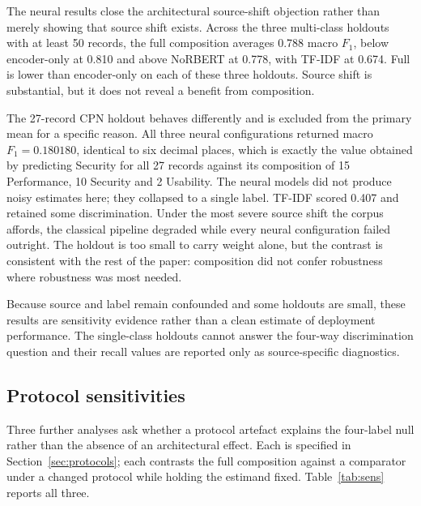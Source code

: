 \documentclass[11pt,a4paper]{article}
\begin{document}
The neural results close the architectural source-shift objection rather than merely showing that source
shift exists. Across the three multi-class holdouts with at least 50 records, the full composition
averages 0.788 macro $F_1$, below encoder-only at 0.810 and above NoRBERT at 0.778, with TF-IDF at 0.674.
Full is lower than encoder-only on each of these three holdouts. Source shift is substantial, but it does
not reveal a benefit from composition.

The 27-record CPN holdout behaves differently and is excluded from the primary mean for a specific
reason. All three neural configurations returned macro $F_1 = 0.180180$, identical to six decimal places,
which is exactly the value obtained by predicting Security for all 27 records against its composition of
15 Performance, 10 Security and 2 Usability. The neural models did not produce noisy estimates here; they
collapsed to a single label. TF-IDF scored 0.407 and retained some discrimination. Under the most severe
source shift the corpus affords, the classical pipeline degraded while every neural configuration failed
outright. The holdout is too small to carry weight alone, but the contrast is consistent with the rest of
the paper: composition did not confer robustness where robustness was most needed.

Because source and label remain confounded and some holdouts are small, these results are sensitivity
evidence rather than a clean estimate of deployment performance. The single-class holdouts cannot answer
the four-way discrimination question and their recall values are reported only as source-specific
diagnostics.

\subsection{Protocol sensitivities}
\label{sec:protocolsens}

Three further analyses ask whether a protocol artefact explains the four-label null rather than the
absence of an architectural effect. Each is specified in Section~\ref{sec:protocols}; each contrasts the
full composition against a comparator under a changed protocol while holding the estimand fixed.
Table~\ref{tab:sens} reports all three.
\end{document}
